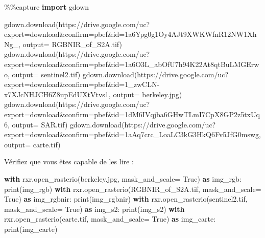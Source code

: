 \documentclass[
]{article}
\newenvironment{Shaded}{}{}
\newcommand{\BuiltInTok}[1]{\textcolor[rgb]{0.00,0.50,0.00}{#1}}
\newcommand{\ControlFlowTok}[1]{\textcolor[rgb]{0.00,0.44,0.13}{\textbf{#1}}}
\newcommand{\ImportTok}[1]{\textcolor[rgb]{0.00,0.50,0.00}{\textbf{#1}}}
\newcommand{\NormalTok}[1]{#1}
\newcommand{\OperatorTok}[1]{\textcolor[rgb]{0.40,0.40,0.40}{#1}}
\newcommand{\StringTok}[1]{\textcolor[rgb]{0.25,0.44,0.63}{#1}}
\newcommand{\VariableTok}[1]{\textcolor[rgb]{0.10,0.09,0.49}{#1}}
\begin{document}
\label{e748f73f}
\label{cb3}
\begin{Shaded}
\begin{Highlighting}[]
\OperatorTok{\%\%}\NormalTok{capture}
\ImportTok{import}\NormalTok{ gdown}

\NormalTok{gdown.download(}\StringTok{\textquotesingle{}https://drive.google.com/uc?export=download\&confirm=pbef\&id=1a6Ypg0g1Oy4AJt9XWKWfnR12NW1XhNg\_\textquotesingle{}}\NormalTok{, output}\OperatorTok{=} \StringTok{\textquotesingle{}RGBNIR\_of\_S2A.tif\textquotesingle{}}\NormalTok{)}
\NormalTok{gdown.download(}\StringTok{\textquotesingle{}https://drive.google.com/uc?export=download\&confirm=pbef\&id=1a6O3L\_abOfU7h94K22At8qtBuLMGErwo\textquotesingle{}}\NormalTok{, output}\OperatorTok{=} \StringTok{\textquotesingle{}sentinel2.tif\textquotesingle{}}\NormalTok{)}
\NormalTok{gdown.download(}\StringTok{\textquotesingle{}https://drive.google.com/uc?export=download\&confirm=pbef\&id=1\_zwCLN{-}x7XJcNHJCH6Z8upEdUXtVtvs1\textquotesingle{}}\NormalTok{, output}\OperatorTok{=} \StringTok{\textquotesingle{}berkeley.jpg\textquotesingle{}}\NormalTok{)}
\NormalTok{gdown.download(}\StringTok{\textquotesingle{}https://drive.google.com/uc?export=download\&confirm=pbef\&id=1dM6IVqjba6GHwTLmI7CpX8GP2z5txUq6\textquotesingle{}}\NormalTok{, output}\OperatorTok{=} \StringTok{\textquotesingle{}SAR.tif\textquotesingle{}}\NormalTok{)}
\NormalTok{gdown.download(}\StringTok{\textquotesingle{}https://drive.google.com/uc?export=download\&confirm=pbef\&id=1aAq7crc\_LoaLC3kG3HkQ6Fv5JfG0mswg\textquotesingle{}}\NormalTok{, output}\OperatorTok{=} \StringTok{\textquotesingle{}carte.tif\textquotesingle{}}\NormalTok{)}
\end{Highlighting}
\end{Shaded}

Vérifiez que vous êtes capable de les lire :

\label{37206eb2}
\label{cb4}
\begin{Shaded}
\begin{Highlighting}[]
\ControlFlowTok{with}\NormalTok{ rxr.open\_rasterio(}\StringTok{\textquotesingle{}berkeley.jpg\textquotesingle{}}\NormalTok{, mask\_and\_scale}\OperatorTok{=} \VariableTok{True}\NormalTok{) }\ImportTok{as}\NormalTok{ img\_rgb:}
    \BuiltInTok{print}\NormalTok{(img\_rgb)}
\ControlFlowTok{with}\NormalTok{ rxr.open\_rasterio(}\StringTok{\textquotesingle{}RGBNIR\_of\_S2A.tif\textquotesingle{}}\NormalTok{, mask\_and\_scale}\OperatorTok{=} \VariableTok{True}\NormalTok{) }\ImportTok{as}\NormalTok{ img\_rgbnir:}
    \BuiltInTok{print}\NormalTok{(img\_rgbnir)}
\ControlFlowTok{with}\NormalTok{ rxr.open\_rasterio(}\StringTok{\textquotesingle{}sentinel2.tif\textquotesingle{}}\NormalTok{, mask\_and\_scale}\OperatorTok{=} \VariableTok{True}\NormalTok{) }\ImportTok{as}\NormalTok{ img\_s2:}
    \BuiltInTok{print}\NormalTok{(img\_s2)}
\ControlFlowTok{with}\NormalTok{ rxr.open\_rasterio(}\StringTok{\textquotesingle{}carte.tif\textquotesingle{}}\NormalTok{, mask\_and\_scale}\OperatorTok{=} \VariableTok{True}\NormalTok{) }\ImportTok{as}\NormalTok{ img\_carte:}
    \BuiltInTok{print}\NormalTok{(img\_carte)}
\end{Highlighting}
\end{Shaded}
\end{document}

